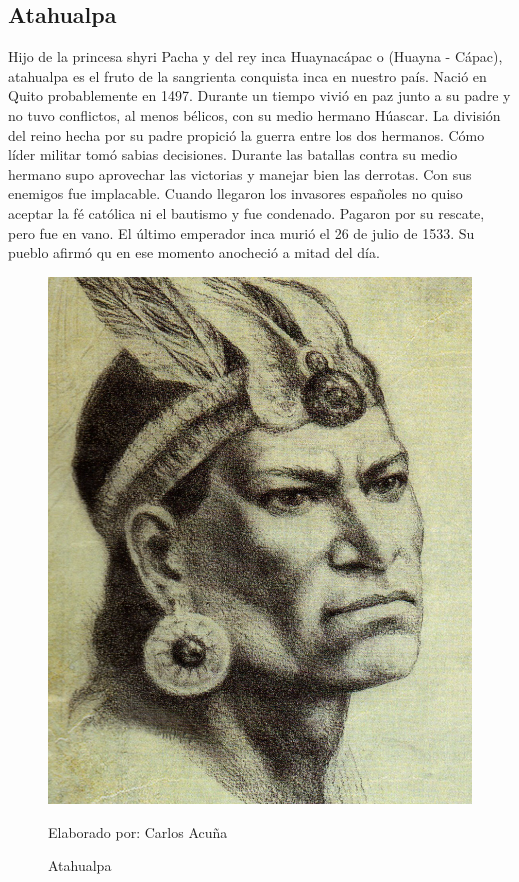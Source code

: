 \documentclass[a4paper, openright, 12pt]{report}
\begin{document}
\subsection*{Atahualpa}
\justify
Hijo de la princesa shyri Pacha y del rey inca Huaynacápac o (Huayna - Cápac), atahualpa es el fruto de la sangrienta conquista inca en nuestro país. Nació en Quito probablemente en 1497. Durante un tiempo vivió en paz junto a su padre y no tuvo conflictos, al menos bélicos, con su medio hermano Húascar. La división del reino hecha por su padre propició la guerra entre los dos hermanos. Cómo líder militar tomó sabias decisiones. Durante las batallas contra su medio hermano supo aprovechar las victorias y manejar bien las derrotas. Con sus enemigos fue implacable. Cuando llegaron los invasores españoles no quiso aceptar la fé católica ni el bautismo y fue condenado. Pagaron por su rescate, pero fue en vano. El último emperador inca murió el 26 de julio de 1533. Su pueblo afirmó qu en ese momento anocheció a mitad del día. \cite{2010batallas}

\begin{figure}[h]
\captionsetup{justification=centering,margin=2cm}
\includegraphics[scale=1]{h3}
\centering
\caption{Atahualpa}
Elaborado por: Carlos Acuña
\label{fig:h3}
\end{figure}
\clearpage
\end{document}
